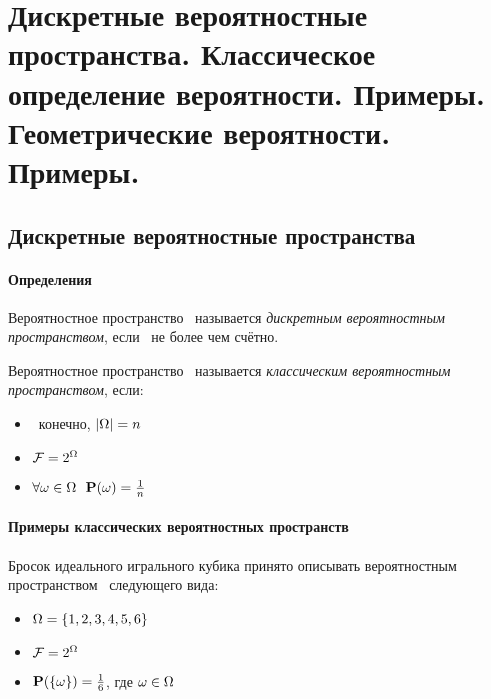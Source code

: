 \section{Дискретные вероятностные пространства. Классическое определение вероятности. Примеры. Геометрические вероятности. Примеры.}

\subsection{Дискретные вероятностные пространства}

\paragraph{Определения}

\begin{definition}
Вероятностное пространство \PSP~называется {\it дискретным вероятностным пространством}, если \oO~не более чем счётно.
\end{definition}

\begin{definition}
Вероятностное пространство \PSP~называется {\it классическим вероятностным пространством}, если:
	\begin{itemize}
	\item \oO~конечно, $|\Omega| = n $
	\item $\mathcal{F} = 2^{\Omega}$
	\item $\forall \omega \in \Omega~~\mathbf{P}(\omega) = \frac{1}{n}$
	\end{itemize}
\end{definition}


\paragraph{Примеры классических вероятностных пространств}

\begin{example}
Бросок идеального игрального кубика принято описывать 
вероятностным пространством \PSP~следующего вида:
\begin{itemize}
		\item $\Omega = \{1, 2, 3, 4, 5, 6\}$
		\item $\mathcal{F} = 2^{\Omega}$
		\item $\mathbf{P}(\{\omega\}) = \frac{1}{6}$, где $\omega \in \Omega$
	\end{itemize}
\end{example}

